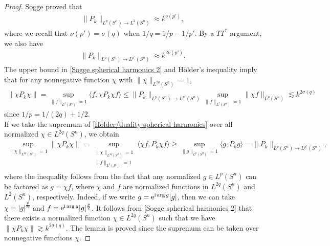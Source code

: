 \documentclass[12pt]{amsart}
\newcommand{\e}{{\rm e}}
\newcommand\I{\mathrm{i}}
\begin{document}
\begin{proof}
Sogge proved \cite[Theorem 4.1]{MR835795} that
\begin{align}\label{Sogge spherical harmonics}
    \|P_k\|_{L^p(S^n)\to L^2(S^n)}\approx k^{\nu(p')},
\end{align}
where we recall that $\nu(p')=\sigma(q)$ when $1/q=1/p-1/p'$. By a $TT^*$ argument, we also have
\begin{align}\label{Sogge spherical harmonics 2}
    \|P_k\|_{L^p(S^n)\to L^{p'}(S^n)}\approx k^{2\nu(p')}.
\end{align}
The upper bound in \eqref{Sogge spherical harmonics 2} and H\"older's inequality imply that for any nonnegative function $\chi$ with $\|\chi\|_{L^{2q}(S^n)}=1$,
\begin{align}\label{Holder/duality spherical harmonics}
\|\chi P_k\chi\|=\sup_{\|f\|_{L^{2}(S^n)}=1}\langle f,\chi P_k\chi f\rangle\leq \|P_k\|_{L^p(S^n)\to L^{p'}(S^n)}\sup_{\|f\|_{L^{2}(S^n)}=1}\|\chi f\|_{L^p(S^n)}\lesssim k^{2\sigma(q)}
\end{align}
since $1/p=1/(2q)+1/2$.\\

If we take the supremum of \eqref{Holder/duality spherical harmonics} over all normalized $\chi\in L^{2q}(S^n)$, we obtain
\begin{align}
 \sup_{\|\chi\|_{L^{2q}(S^n)}=1}\|\chi P_k\chi\|
 = \sup_{\substack{\|\chi\|_{L^{2q}(S^n)}=1\\ \|f\|_{L^{2}(S^n)}=1}}  
\langle \chi f,P_k\chi f\rangle
 \geq \sup_{\|g\|_{L^p(S^n)}=1}\langle g,P_k g\rangle
 =\|P_k\|_{L^p(S^n)\to L^{p'}(S^n)},
\end{align}
where the inequality follows from the fact that any normalized $g\in L^{p}(S^n)$ can be factored as $g=\chi f$, where $\chi$ and $f$ are normalized functions in $L^{2q}(S^n)$ and $L^{2}(S^n)$, respectively. Indeed, if we write $g=\e^{\I\arg g}|g|$, then we can take $\chi=|g|^{\frac{p}{2q}}$ and $f=\e^{\I\arg g}|g|^{\frac{p}{2}}$. It follows from \eqref{Sogge spherical harmonics 2} that there exists a normalized function $\chi\in L^{2q}(S^n)$ such that we have $\|\chi P_k\chi\|\gtrsim k^{2\sigma(q)}$. The lemma is proved since the supremum can be taken over nonnegative functions $\chi$.
\end{proof}
\end{document}
